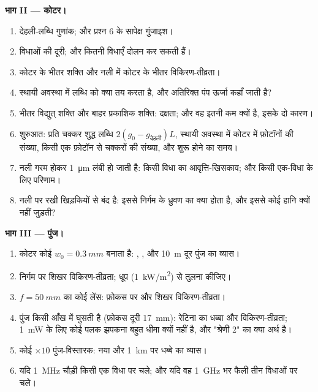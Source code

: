 \begin{problem}
\textbf{भाग II --- कोटर।}
\begin{enumerate}[resume]
  \item देहली-लब्धि गुणांक; और प्रश्न 6 के सापेक्ष गुंजाइश।
  \item विधाओं की दूरी; और कितनी विधाएँ दोलन कर सकती हैं।
  \item कोटर के भीतर शक्ति और नली में कोटर के भीतर विकिरण-तीव्रता।
  \item स्थायी अवस्था में लब्धि को क्या तय करता है, और अतिरिक्त
        पंप ऊर्जा कहाँ जाती है?
  \item भीतर विद्युत् शक्ति और बाहर प्रकाशिक शक्ति: दक्षता; और वह इतनी
        कम क्यों है, इसके दो कारण।
  \item शुरुआत: प्रति चक्कर शुद्ध लब्धि $2(g_0 - g_{\text{देहली}})L$,
        स्थायी अवस्था में कोटर में फ़ोटॉनों की संख्या, किसी एक फ़ोटॉन से
        चक्करों की संख्या, और शुरू होने का समय।
  \item नली गरम होकर \qty{1}{\micro m} लंबी हो जाती है: किसी विधा का
        आवृत्ति-खिसकाव; और किसी एक-विधा  के लिए परिणाम।
  \item नली  पर रखी खिड़कियों से बंद है: इससे निर्गम के
        ध्रुवण का क्या होता है, और इससे कोई हानि क्यों नहीं
        जुड़ती?
\end{enumerate}

\textbf{भाग III --- पुंज।}
\begin{enumerate}[resume]
  \item कोटर कोई  $w_0 = \qty{0.3}{mm}$ बनाता है: , , और \qty{10}{m} दूर पुंज का व्यास।
  \item निर्गम पर शिखर विकिरण-तीव्रता; धूप
        (\qty{1}{kW/m^2}) से तुलना कीजिए।
  \item $f = \qty{50}{mm}$ का कोई लेंस: फ़ोकस पर  और शिखर
        विकिरण-तीव्रता।
  \item पुंज किसी आँख में घुसती है (फ़ोकस दूरी \qty{17}{mm}): रेटिना का धब्बा
        और विकिरण-तीव्रता; \qty{1}{mW} के लिए कोई पलक झपकना बहुत धीमा क्यों नहीं है,
        और "श्रेणी 2" का क्या अर्थ है।
  \item कोई $\times 10$ पुंज-विस्तारक: नया  और \qty{1}{km} पर
        धब्बे का व्यास।
  \item {} यदि  \qty{1}{MHz} चौड़ी किसी एक विधा पर चले;
        और यदि वह \qty{1}{GHz} भर फैली तीन विधाओं पर चले।
\end{enumerate}


\end{problem}
